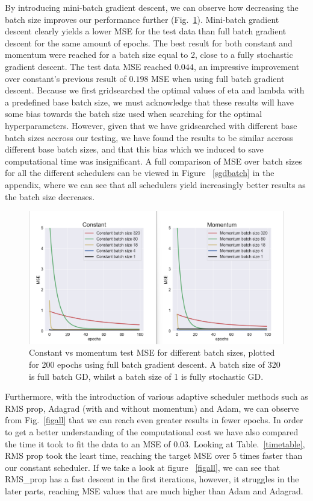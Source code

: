 \documentclass[onecolumn,10pt,cleanfoot]{asme2ej}
\begin{document}
By introducing mini-batch gradient descent, we can observe how decreasing the batch size improves our performance further (Fig.~\ref{batch_constant_v_momentum}). Mini-batch gradient descent clearly yields a lower MSE for the test data than full batch gradient descent for the same amount of epochs. The best result for both constant and momentum were reached for a batch size equal to 2, close to a fully stochastic gradient descent. The test data MSE reached $0.044$, an impressive improvement over constant's previous result of $0.198$ MSE when using full batch gradient descent. Because we first gridsearched the optimal values of eta and lambda with a predefined base batch size, we must acknowledge that these results will have some bias towards the batch size used when searching for the optimal hyperparameters. However, given that we have gridsearched with different base batch sizes accross our testing, we have found the results to be similar accross different base batch sizes, and that this bias which we induced to save computational time was insignificant. A full comparison of MSE over batch sizes for all the different schedulers can be viewed in Figure ~\ref{sgdbatch} in the appendix, where we can see that all schedulers yield increasingly better results as the batch size decreases.

\begin{figure}[H]
\centerline{\includegraphics[width=6in]{figure/new_SGD_batch_momentum_constant.png}}
\caption{Constant vs momentum test MSE for different batch sizes, plotted for 200 epochs using full batch gradient descent. A batch size of 320 is full batch GD, whilst a batch size of 1 is fully stochastic GD.}
\label{batch_constant_v_momentum}
\end{figure}

Furthermore, with the introduction of various adaptive scheduler methods such as RMS prop, Adagrad (with and without momentum) and Adam, we can observe from Fig.~\ref{figall} that we can reach even greater results in fewer epochs. In order to get a better understanding of the computational cost we have also compared the time it took to fit the data to an MSE of $0.03$. Looking at Table.~\ref{timetable}, RMS prop took the least time, reaching the target MSE over 5 times faster than our constant scheduler. If we take a look at figure ~\ref{figall}, we can see that RMS\_prop has a fast descent in the first iterations, however, it struggles in the later parts, reaching MSE values that are much higher than Adam and Adagrad.
\end{document}
